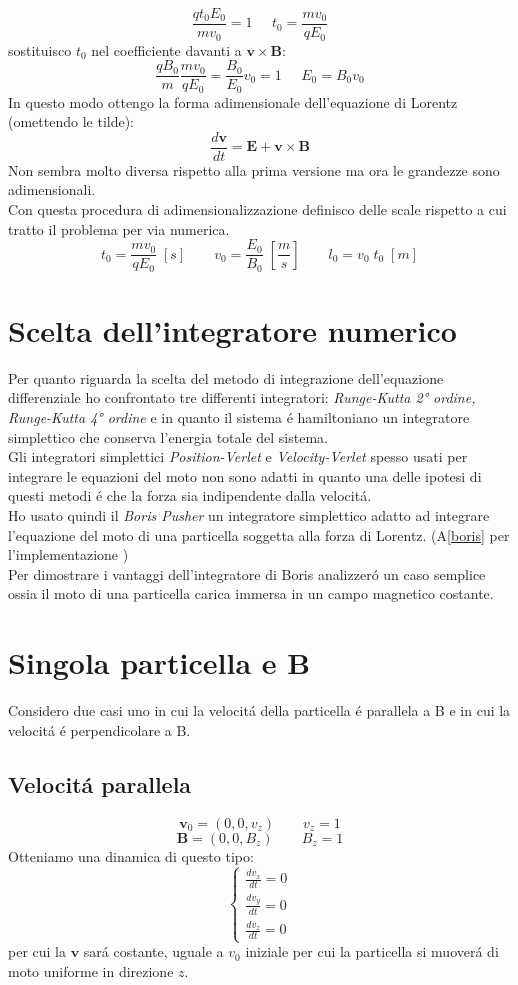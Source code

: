 $$\frac{qt_0 E_0}{mv_0}=1 \;\;\;\;\; t_0=\frac{mv_0}{q E_0}$$
sostituisco $t_0$ nel coefficiente davanti a $\mathbf{v} \times \mathbf{B}:$
$$\frac{qB_0}{m } \frac{m v_0}{q E_0}=\frac{B_0}{E_0}{v_0}=1 \;\;\;\;\; E_0=B_0v_0$$
In questo modo ottengo la forma adimensionale dell'equazione di Lorentz (omettendo le tilde):
$$\frac{d\mathbf{v}}{dt}=\mathbf{E}+\mathbf{v} \times \mathbf{B} $$
Non sembra molto diversa rispetto alla prima versione ma ora le grandezze sono adimensionali. \\
Con questa procedura di adimensionalizzazione definisco delle scale rispetto a cui tratto il problema per via numerica.
$$t_0 = \frac{m  v_0}  {q  E_0}\; [s] \qquad v_0 = \frac{E_0}{B_0} \; \left[\frac{m}{s}\right] \qquad l_0 = v_0\;t_0 \; [m]$$



\section{Scelta dell'integratore numerico}
Per quanto riguarda la scelta del metodo di integrazione dell'equazione differenziale ho confrontato tre differenti integratori: \emph{Runge-Kutta 2°  ordine, Runge-Kutta 4° ordine} e in quanto il sistema é hamiltoniano un integratore simplettico che conserva l'energia totale del sistema. \\
Gli integratori simplettici \emph{Position-Verlet} e \emph{Velocity-Verlet} spesso usati per integrare le equazioni del moto non sono adatti in quanto una delle ipotesi di questi metodi é che la forza sia indipendente dalla velocitá.\\
Ho usato quindi il \emph{Boris Pusher} un integratore simplettico adatto ad integrare l'equazione del moto di una particella soggetta alla forza di Lorentz. (A\ref{boris} per l'implementazione )\\
Per dimostrare i vantaggi dell'integratore di Boris analizzeró un caso semplice ossia il moto di una particella carica immersa in un campo magnetico costante.

\section{Singola particella e B}
Considero due casi uno in cui la velocitá della particella é parallela a B e in cui la velocitá é perpendicolare a B.


\subsection{Velocitá parallela}
$$\mathbf{v}_0=(0,0,v_z) \qquad v_z=1$$
$$\mathbf{B}=(0,0,B_z) \qquad B_z=1$$
Otteniamo una dinamica di questo tipo:
$$
\begin{cases} 
\frac{dv_x}{dt}= 0 \\ 
\frac{dv_y}{dt}= 0   \\ 
\frac{dv_z}{dt}= 0 
\end{cases}
$$
per cui la $\mathbf{v}$ sará costante, uguale a $v_0$ iniziale per cui la particella si muoverá di moto uniforme in direzione $z$.

